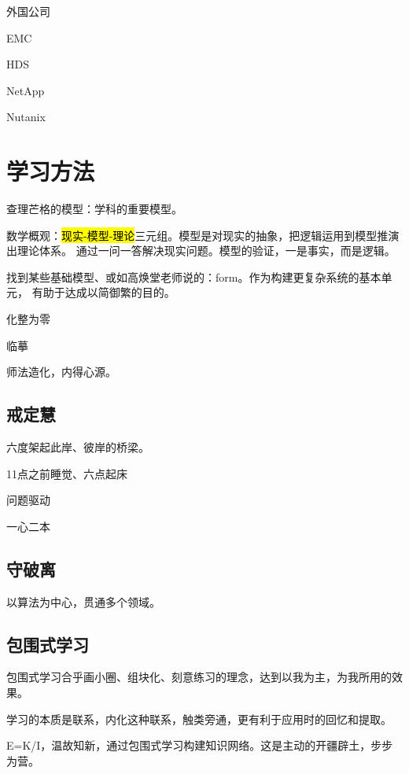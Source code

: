 外国公司
\begin{enumbox}
\item EMC
\item HDS
\item NetApp
\item Nutanix
\end{enumbox}

\section{学习方法}

查理芒格的模型：学科的重要模型。

数学概观：\hl{现实-模型-理论}三元组。模型是对现实的抽象，把逻辑运用到模型推演出理论体系。
通过一问一答解决现实问题。模型的验证，一是事实，而是逻辑。

找到某些基础模型、或如高焕堂老师说的：form。作为构建更复杂系统的基本单元，
有助于达成以简御繁的目的。

化整为零

临摹

师法造化，内得心源。

\subsection{戒定慧}

六度架起此岸、彼岸的桥梁。

\begin{enumbox}
\item 11点之前睡觉、六点起床
\item 问题驱动
\item 一心二本
\end{enumbox}

\subsection{守破离}

以算法为中心，贯通多个领域。

\subsection{包围式学习}

包围式学习合乎画小圈、组块化、刻意练习的理念，达到以我为主，为我所用的效果。

学习的本质是联系，内化这种联系，触类旁通，更有利于应用时的回忆和提取。

E=K/I，温故知新，通过包围式学习构建知识网络。这是主动的开疆辟土，步步为营。

